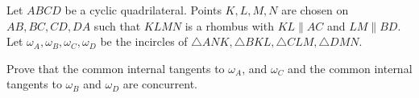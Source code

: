 Let $ABCD$ be a cyclic quadrilateral. Points $K, L, M, N$ are chosen on $AB, BC, CD, DA$ such that $KLMN$ is a rhombus with $KL \parallel AC$ and $LM \parallel BD$. Let $\omega_A, \omega_B, \omega_C, \omega_D$ be the incircles of $\triangle ANK, \triangle BKL, \triangle CLM, \triangle DMN$.

Prove that the common internal tangents to $\omega_A$, and $\omega_C$ and the common internal tangents to $\omega_B$ and $\omega_D$ are concurrent.